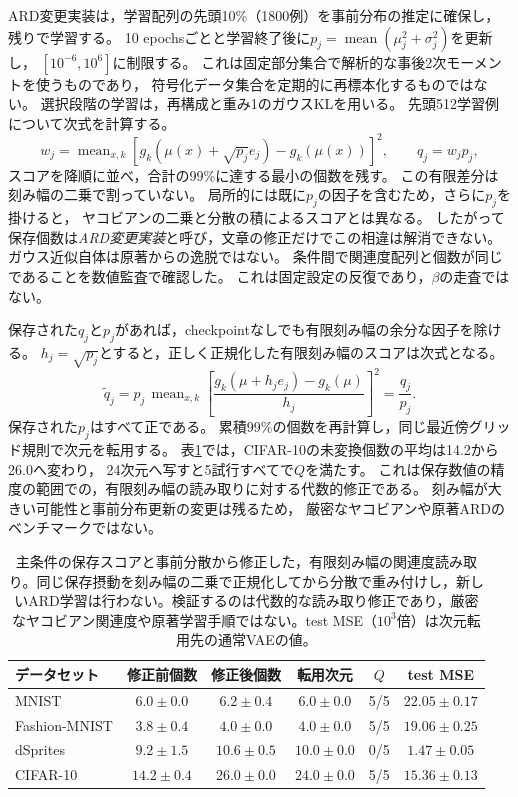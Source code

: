\documentclass[11pt,a4paper]{ltjsarticle}
\begin{document}
ARD変更実装は，学習配列の先頭10\%（1800例）を事前分布の推定に確保し，残りで学習する。
10 epochsごとと学習終了後に$p_j=\operatorname{mean}(\mu_j^2+\sigma_j^2)$を更新し，
$[10^{-6},10^6]$に制限する。
これは固定部分集合で解析的な事後2次モーメントを使うものであり，
符号化データ集合を定期的に再標本化するものではない。
選択段階の学習は，再構成と重み1のガウスKLを用いる。
先頭512学習例について次式を計算する。
\begin{equation}
 w_j=\operatorname{mean}_{x,k}
 [g_k(\mu(x)+\sqrt{p_j}e_j)-g_k(\mu(x))]^2,
 \qquad q_j=w_jp_j,
 \label{eq:ardlocal}
\end{equation}
スコアを降順に並べ，合計の99\%に達する最小の個数を残す。
この有限差分は刻み幅の二乗で割っていない。
局所的には既に$p_j$の因子を含むため，さらに$p_j$を掛けると，
ヤコビアンの二乗と分散の積によるスコアとは異なる。
したがって保存個数は\emph{ARD変更実装}と呼び，文章の修正だけでこの相違は解消できない。
ガウス近似自体は原著からの逸脱ではない。
条件間で関連度配列と個数が同じであることを数値監査で確認した。
これは固定設定の反復であり，$\beta$の走査ではない。

保存された$q_j$と$p_j$があれば，checkpointなしでも有限刻み幅の余分な因子を除ける。
$h_j=\sqrt{p_j}$とすると，正しく正規化した有限刻み幅のスコアは次式となる。
\begin{equation}
 \widetilde q_j
 =p_j\,\operatorname{mean}_{x,k}
 \left[\frac{g_k(\mu+h_je_j)-g_k(\mu)}{h_j}\right]^2
 =\frac{q_j}{p_j}.
 \label{eq:ardcorrected}
\end{equation}
保存された$p_j$はすべて正である。
累積99\%の個数を再計算し，同じ最近傍グリッド規則で次元を転用する。
表\ref{tab:ard_normalized}では，CIFAR-10の未変換個数の平均は14.2から26.0へ変わり，
24次元へ写すと5試行すべてで$Q$を満たす。
これは保存数値の精度の範囲での，有限刻み幅の読み取りに対する代数的修正である。
刻み幅が大きい可能性と事前分布更新の変更は残るため，
厳密なヤコビアンや原著ARDのベンチマークではない。
\begin{table}[H]
\caption{主条件の保存スコアと事前分散から修正した，有限刻み幅の関連度読み取り。同じ保存摂動を刻み幅の二乗で正規化してから分散で重み付けし，新しいARD学習は行わない。検証するのは代数的な読み取り修正であり，厳密なヤコビアン関連度や原著学習手順ではない。test MSE（$10^3$倍）は次元転用先の通常VAEの値。}\label{tab:ard_normalized}
\small
\setlength{\tabcolsep}{3pt}
\begin{tabular*}{\textwidth}{@{\extracolsep{\fill}}lccccc@{}}
\toprule
データセット & 修正前個数 & 修正後個数 & 転用次元 & $Q$ & test MSE \\
\midrule
MNIST & $6.0 \pm 0.0$ & $6.2 \pm 0.4$ & $6.0 \pm 0.0$ & 5/5 & $22.05 \pm 0.17$ \\
Fashion-MNIST & $3.8 \pm 0.4$ & $4.0 \pm 0.0$ & $4.0 \pm 0.0$ & 5/5 & $19.06 \pm 0.25$ \\
dSprites & $9.2 \pm 1.5$ & $10.6 \pm 0.5$ & $10.0 \pm 0.0$ & 0/5 & $1.47 \pm 0.05$ \\
CIFAR-10 & $14.2 \pm 0.4$ & $26.0 \pm 0.0$ & $24.0 \pm 0.0$ & 5/5 & $15.36 \pm 0.13$ \\
\bottomrule\end{tabular*}
\end{table}
\end{document}
